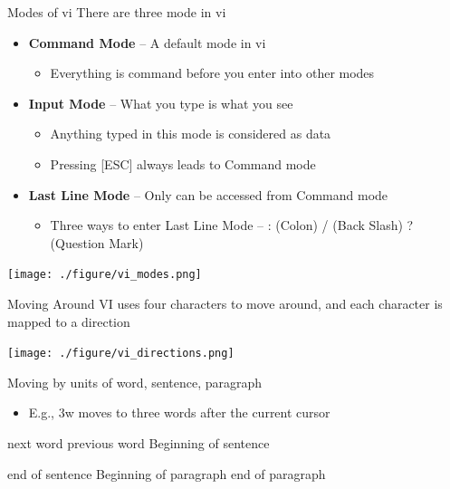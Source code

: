 \documentclass[newPxFont,sthlmFooter,nooffset]{beamer}
\begin{document}
\begin{frame}[t]{Modes of vi}
There are three mode in vi
\begin{itemize}
\item \textbf{Command Mode} – A default mode in vi
\begin{itemize}
\item Everything is command before you enter into other modes
\end{itemize}
\item \textbf{Input Mode} – What you type is what you see
\begin{itemize}
\item Anything typed in this mode is considered as data
\item Pressing [ESC] always leads to Command mode
\end{itemize}
\item \textbf{Last Line Mode} – Only can be accessed from Command mode
\begin{itemize}
\item Three ways to enter Last Line Mode – : (Colon) / (Back Slash) ? (Question Mark)
\end{itemize}
\end{itemize}
\begin{center}
 \texttt{[image: ./figure/vi\_modes.png]}
\end{center}
\end{frame}




\begin{frame}[t]{Moving Around}
VI uses four characters to move around, and each character is mapped to a direction

\begin{center}
 \texttt{[image: ./figure/vi\_directions.png]}
\end{center}

Moving by units of word, sentence, paragraph
\begin{itemize}
\item E.g., 3w moves to three words after the current cursor
\end{itemize}


 next word \hfill {} previous word \hfill \keystroke{(} Beginning of sentence

\bigskip
\keystroke{)} end of sentence \hfill \keystroke{\{} Beginning of paragraph \hfill \keystroke{\}} end of paragraph
\end{frame}
\end{document}
